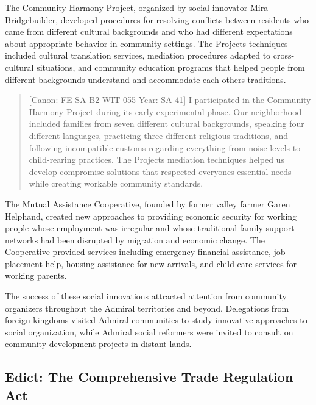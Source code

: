 The Community Harmony Project, organized by social innovator Mira
Bridgebuilder, developed procedures for resolving conflicts between
residents who came from different cultural backgrounds and who had
different expectations about appropriate behavior in community settings.
The Project\textquotesingle s techniques included cultural translation
services, mediation procedures adapted to cross-cultural situations, and
community education programs that helped people from different
backgrounds understand and accommodate each other\textquotesingle s
traditions.

\begin{quote}
{[}Canon: FE-SA-B2-WIT-055 \textbar{} Year: SA 41{]} I participated in
the Community Harmony Project during its early experimental phase. Our
neighborhood included families from seven different cultural
backgrounds, speaking four different languages, practicing three
different religious traditions, and following incompatible customs
regarding everything from noise levels to child-rearing practices. The
Project\textquotesingle s mediation techniques helped us develop
compromise solutions that respected everyone\textquotesingle s essential
needs while creating workable community standards.
\end{quote}

The Mutual Assistance Cooperative, founded by former valley farmer Garen
Helphand, created new approaches to providing economic security for
working people whose employment was irregular and whose traditional
family support networks had been disrupted by migration and economic
change. The Cooperative provided services including emergency financial
assistance, job placement help, housing assistance for new arrivals, and
child care services for working parents.

The success of these social innovations attracted attention from
community organizers throughout the Admiral territories and beyond.
Delegations from foreign kingdoms visited Admiral communities to study
innovative approaches to social organization, while Admiral social
reformers were invited to consult on community development projects in
distant lands.

\subsection{Edict: The Comprehensive Trade Regulation
Act}\label{edict-the-comprehensive-trade-regulation-act}

